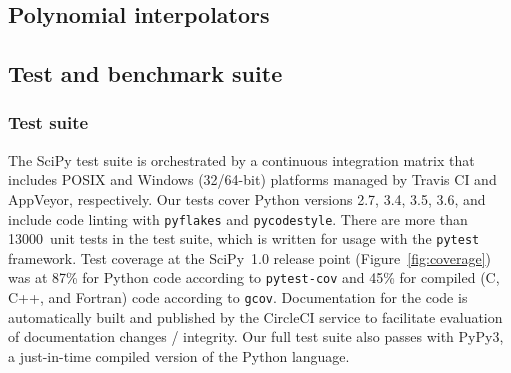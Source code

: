 \documentclass[fleqn,10pt]{wlscirep}
\begin{document}
\subsection*{Polynomial interpolators}



\subsection*{Test and benchmark suite}

\subsubsection*{Test suite}

The SciPy test suite is orchestrated by a continuous integration matrix that
includes POSIX and Windows (32/64-bit) platforms managed by Travis CI and
AppVeyor, respectively. Our tests cover Python versions 2.7, 3.4, 3.5, 3.6, and
include code linting with \texttt{pyflakes} and \texttt{pycodestyle}. There
are more than \num{13000}~unit tests in the test suite, which is written for usage
with the \texttt{pytest}\cite{pytest} framework.
Test coverage at the SciPy~1.0 release point (Figure~\ref{fig:coverage}) was at
87\% for Python code according to \texttt{pytest-cov}\cite{pytest-cov} and
45\% for compiled (C, C++, and Fortran) code according to \texttt{gcov}\cite{gcov}.
Documentation for the code is automatically built and published by
the CircleCI service to facilitate evaluation of documentation changes /
integrity.  Our full test suite also passes with PyPy3\cite{Bolz:2009:TMP:1565824.1565827}, a just-in-time compiled
version of the Python language.
\end{document}
